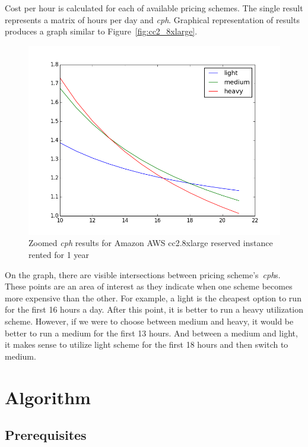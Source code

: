 \documentclass[]{final_report}
\begin{document}
Cost per hour is calculated for each of available pricing schemes. The single result represents a matrix of hours per day and \textit{cph}. Graphical representation of results produces a graph similar to Figure~\ref{fig:cc2_8xlarge}. \par 
\begin{figure}[H]
	\includegraphics[width=\linewidth]{figures/cph_cc2_8xlarge_zoom}
	\caption{Zoomed \textit{cph} results for Amazon AWS cc2.8xlarge reserved instance rented for 1 year~\cite{AWS:light}~\cite{AWS:medium}~\cite{AWS:heavy}}
	\label{fig:cph_cc2_8xlarge_zoom}
\end{figure}

On the graph, there are visible intersections between pricing scheme's~\textit{cph}s. These points are an area of interest as they indicate when one scheme becomes more expensive than the other. For example, a light is the cheapest option to run for the first 16 hours a day. After this point, it is better to run a heavy utilization scheme. However, if we were to choose between medium and heavy, it would be better to run a medium for the first 13 hours. And between a medium and light, it makes sense to utilize light scheme for the first 18 hours and then switch to medium. 

\section{Algorithm}

\subsection{Prerequisites} 
\end{document}
